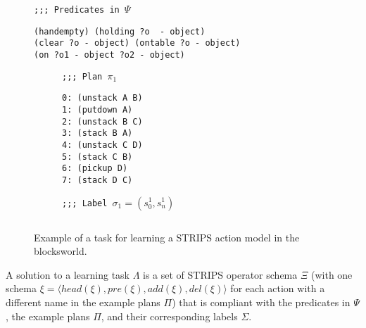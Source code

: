 \documentclass[letterpaper]{article} %
\newcommand{\tup}[1]{{\langle #1 \rangle}}
\begin{document}
\begin{figure}
\begin{small}
{\tt ;;; Predicates in $\Psi$}
\begin{verbatim}
(handempty) (holding ?o  - object)
(clear ?o - object) (ontable ?o - object)
(on ?o1 - object ?o2 - object)
\end{verbatim}
\end{small}

\vspace{0.5cm}

\begin{subfigure}{.25\textwidth}
\begin{small}
{\tt ;;; Plan $\pi_1$}
\begin{verbatim}
0: (unstack A B)
1: (putdown A)
2: (unstack B C)
3: (stack B A)
4: (unstack C D)
5: (stack C B)
6: (pickup D)
7: (stack D C)
\end{verbatim}
\end{small}
\end{subfigure}%
\begin{subfigure}{.6\textwidth}
{\small\tt ;;; Label $\sigma_1=(s_0^1,s_{n}^1)$}
\begin{lstlisting}[mathescape]
\end{lstlisting}
\vspace{0.1cm}
\vspace{0.6cm}
\end{subfigure}%

 \caption{\small Example of a task for learning a STRIPS action model in the blocksworld.}
\label{fig:lexample}
\end{figure}

A solution to a learning task $\Lambda$ is a set of STRIPS operator schema $\Xi$ (with one schema $\xi=\tup{head(\xi),pre(\xi),add(\xi),del(\xi)}$ for each action with a different name in the example plans $\Pi$) that is compliant with the predicates in $\Psi$, the example plans $\Pi$, and their corresponding labels $\Sigma$.
\end{document}
